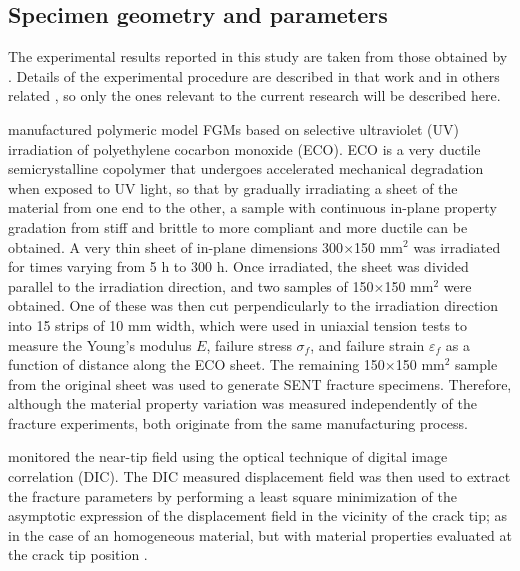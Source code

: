 \subsection{Specimen geometry and parameters}
\label{sec:model1}

The experimental results reported in this study are taken from those obtained by \cite{Abanto-Bueno2006}. Details of the experimental procedure are described in that work and in others related \citep{Lambros1999,Li2000}, so only the ones relevant to the current research will be described here. 

\cite{Abanto-Bueno2006} manufactured polymeric model FGMs based on selective ultraviolet (UV) irradiation of polyethylene cocarbon monoxide (ECO). ECO is a very ductile semicrystalline copolymer that undergoes accelerated mechanical degradation when exposed to UV light, so that by gradually irradiating a sheet of the material from one end to the other, a sample with continuous in-plane property gradation from stiff and brittle to more compliant and more ductile can be obtained. A very thin sheet of in-plane dimensions 300$\times$150 mm$^2$ was irradiated for times varying from 5 h to 300 h. Once irradiated, the sheet was divided parallel to the irradiation direction, and two samples of 150$\times$150 mm$^2$ were obtained. One of these was then cut perpendicularly to the irradiation direction into 15 strips of 10 mm width, which were used in uniaxial tension tests to measure the Young's modulus $E$, failure stress $\sigma_f$, and failure strain $\varepsilon_f$ as a function of distance along the ECO sheet. The remaining 150$\times$150 mm$^2$ sample from the original sheet was used to generate SENT fracture specimens. Therefore, although the material property variation was measured independently of the fracture experiments, both originate from the same manufacturing process.
 
\cite{Abanto-Bueno2006} monitored the near-tip field using the optical technique of digital image correlation (DIC). The DIC measured displacement field was then used to extract the fracture parameters by performing a least square minimization of the asymptotic expression of the displacement field in the vicinity of the crack tip; as in the case of an homogeneous material, but with material properties evaluated at the crack tip position \citep{Eischen1987}.

